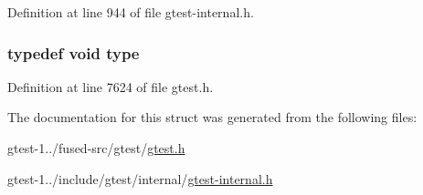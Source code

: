 \-Definition at line 944 of file gtest-\/internal.\-h.

\hypertarget{structtesting_1_1internal_1_1EnableIf_3_01true_01_4_ab1552f8e45b26f82fdca0e71da39d755}{
\subsubsection[{type}]{\setlength{\rightskip}{0pt plus 5cm}typedef void {\bf type}}}\label{d0/d2f/structtesting_1_1internal_1_1EnableIf_3_01true_01_4_ab1552f8e45b26f82fdca0e71da39d755}


\-Definition at line 7624 of file gtest.\-h.



\-The documentation for this struct was generated from the following files\-:\begin{DoxyCompactItemize}
\item 
gtest-\/1../fused-\/src/gtest/\hyperlink{fused-src_2gtest_2gtest_8h}{gtest.\-h}\item 
gtest-\/1../include/gtest/internal/\hyperlink{gtest-internal_8h}{gtest-\/internal.\-h}\end{DoxyCompactItemize}
